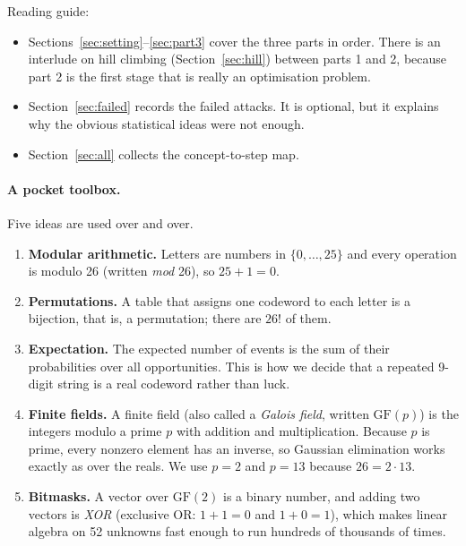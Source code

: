 \documentclass[11pt]{article}
\begin{document}
Reading guide:
\begin{itemize}
  \item Sections~\ref{sec:setting}--\ref{sec:part3} cover the three parts in
        order.  There is an interlude on hill climbing
        (Section~\ref{sec:hill}) between parts 1 and 2, because part 2 is the
        first stage that is really an optimisation problem.
  \item Section~\ref{sec:failed} records the failed attacks.  It is optional,
        but it explains why the obvious statistical ideas were not enough.
  \item Section~\ref{sec:all} collects the concept-to-step map.
\end{itemize}

\paragraph{A pocket toolbox.}  Five ideas are used over and over.

\begin{enumerate}[label=\arabic*.]
  \item \textbf{Modular arithmetic.}  Letters are numbers in
        $\{0,\dots,25\}$ and every operation is modulo 26 (written
        \emph{mod} 26), so $25+1=0$.
  \item \textbf{Permutations.}  A table that assigns one codeword to each
        letter is a bijection, that is, a permutation; there are $26!$ of
        them.
  \item \textbf{Expectation.}  The expected number of events is the sum of
        their probabilities over all opportunities.  This is how we decide
        that a repeated 9-digit string is a real codeword rather than luck.
  \item \textbf{Finite fields.}  A finite field (also called a \emph{Galois
        field}, written $\mathrm{GF}(p)$) is the integers modulo a prime $p$
        with addition and multiplication.  Because $p$ is prime, every
        nonzero element has an inverse, so Gaussian elimination works exactly
        as over the reals.  We use $p=2$ and $p=13$ because $26=2\cdot13$.
  \item \textbf{Bitmasks.}  A vector over $\mathrm{GF}(2)$ is a binary number,
        and adding two vectors is \emph{XOR} (exclusive OR: $1+1=0$ and
        $1+0=1$), which makes linear algebra on 52 unknowns fast enough to
        run hundreds of thousands of times.
\end{enumerate}
\end{document}
